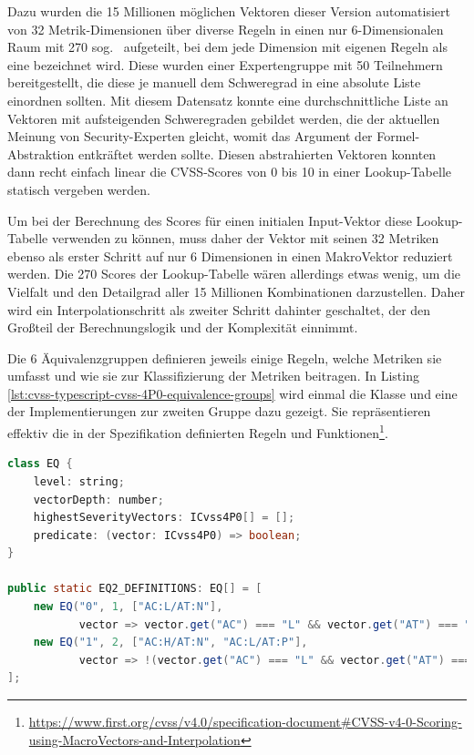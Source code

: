 Dazu wurden die 15 Millionen möglichen Vektoren dieser Version automatisiert von 32 Metrik-Dimensionen über diverse Regeln in einen nur 6-Dimensionalen Raum mit 270 sog.\  aufgeteilt, bei dem jede Dimension mit eigenen Regeln als eine  bezeichnet wird.
Diese wurden einer Expertengruppe mit 50 Teilnehmern bereitgestellt, die diese je manuell dem Schweregrad in eine absolute Liste einordnen sollten.
Mit diesem Datensatz konnte eine durchschnittliche Liste an Vektoren mit aufsteigenden Schweregraden gebildet werden, die der aktuellen Meinung von Security-Experten gleicht, womit das Argument der Formel-Abstraktion entkräftet werden sollte.
Diesen abstrahierten Vektoren konnten dann recht einfach linear die CVSS-Scores von 0 bis 10 in einer Lookup-Tabelle statisch vergeben werden.

Um bei der Berechnung des Scores für einen initialen Input-Vektor diese Lookup-Tabelle verwenden zu können, muss daher der Vektor mit seinen 32 Metriken ebenso als erster Schritt auf nur 6 Dimensionen in einen MakroVektor reduziert werden.
Die 270 Scores der Lookup-Tabelle wären allerdings etwas wenig, um die Vielfalt und den Detailgrad aller 15 Millionen Kombinationen darzustellen.
Daher wird ein Interpolationschritt als zweiter Schritt dahinter geschaltet, der den Großteil der Berechnungslogik und der Komplexität einnimmt.

Die 6 Äquivalenzgruppen definieren jeweils einige Regeln, welche Metriken sie umfasst und wie sie zur Klassifizierung der Metriken beitragen.
In Listing \ref{lst:cvss-typescript-cvss-4P0-equivalence-groups} wird einmal die Klasse  und eine der Implementierungen zur zweiten Gruppe dazu gezeigt.
Sie repräsentieren effektiv die in der Spezifikation definierten Regeln und Funktionen\footnote{\url{https://www.first.org/cvss/v4.0/specification-document\#CVSS-v4-0-Scoring-using-MacroVectors-and-Interpolation}}.

\begin{lstlisting}[language=Java, label={lst:cvss-typescript-cvss-4P0-equivalence-groups}, caption={CVSS 4.0 Äquivalenzgruppen in TypeScript}, basicstyle=\scriptsize]
class EQ {
    level: string;
    vectorDepth: number;
    highestSeverityVectors: ICvss4P0[] = [];
    predicate: (vector: ICvss4P0) => boolean;
}

public static EQ2_DEFINITIONS: EQ[] = [
    new EQ("0", 1, ["AC:L/AT:N"],
           vector => vector.get("AC") === "L" && vector.get("AT") === "N"),
    new EQ("1", 2, ["AC:H/AT:N", "AC:L/AT:P"],
           vector => !(vector.get("AC") === "L" && vector.get("AT") === "N"))
];
\end{lstlisting}

